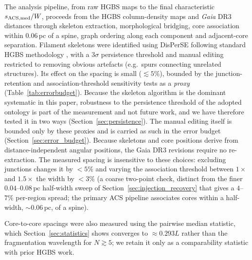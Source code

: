 \documentclass[usenatbib,twoside,twocolumn]{mnras}
\begin{document}
The analysis pipeline, from raw HGBS maps to the final characteristic $s_{\rm ACS,med}/W$, proceeds from the HGBS column-density maps and \textit{Gaia} DR3 distances through skeleton extraction, morphological bridging, core association within $0.06$\,pc of a spine, graph ordering along each component and adjacent-core separation. Filament skeletons were identified using DisPerSE \citep{Sousbie2011} following standard HGBS methodology \citep{Arzoumanian2011}, with a $3\sigma$ persistence threshold and manual editing restricted to removing obvious artefacts (e.g.\ spurs connecting unrelated structures). Its effect on the spacing is small ($\lesssim5\%$), bounded by the junction-retention and association-threshold sensitivity tests as a \emph{proxy} (Table~\ref{tab:errorbudget}). Because the skeleton algorithm is the dominant systematic in this paper, robustness to the persistence threshold of the adopted ontology is part of the measurement and not future work, and we have therefore tested it in two ways (Section~\ref{sec:persistence}). The manual editing itself is bounded only by these proxies and is carried as such in the error budget (Section~\ref{sec:error_budget}). Because skeletons and core positions derive from distance-independent angular positions, the Gaia DR3 revisions require no re-extraction. The measured spacing is insensitive to these choices: excluding junctions changes it by $<5\%$ and varying the association threshold between $1\times$ and $1.5\times$ the width by $<3\%$ (a coarse two-point check, distinct from the finer $0.04$--$0.08$\,pc half-width sweep of Section~\ref{sec:injection_recovery} that gives a $4$--$7\%$ per-region spread; the primary ACS pipeline associates cores within a half-width, $\sim0.06$\,pc, of a spine).

Core-to-core spacings were also measured using the pairwise median statistic, which Section~\ref{sec:statistics} shows converges to $\approx0.293L$ rather than the fragmentation wavelength for $N\gtrsim5$; we retain it only as a comparability statistic with prior HGBS work.
\end{document}

